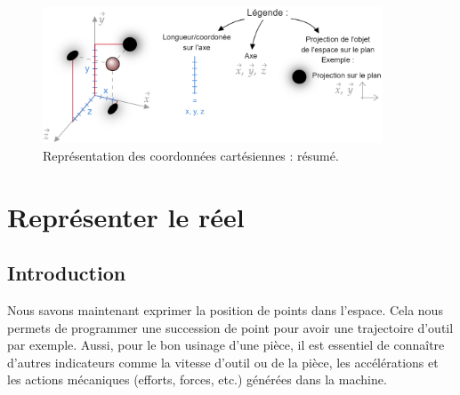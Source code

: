 \documentclass[
	11pt, %
	fleqn, %
	a4paper, %
]{LegrandOrangeBook}
\begin{document}
\begin{figure}[H] %
	\centering %
	\includegraphics[width=0.9\textwidth]{Images/coord10.png} %
	\caption{Représentation des coordonnées cartésiennes : résumé.}
	\label{coord10} %
\end{figure}



\chapterspaceabove{6.25cm} %
\chapterspacebelow{7.5cm} %

\chapter{Représenter le réel}

\section{Introduction}
Nous savons maintenant exprimer la position de points dans l'espace. Cela nous permets de programmer une succession de point pour avoir une trajectoire d'outil par exemple. Aussi, pour le bon usinage d'une pièce, il est essentiel de connaître d'autres indicateurs comme la vitesse d'outil ou de la pièce, les accélérations et les actions mécaniques (efforts, forces, etc.) générées dans la machine.

\begin{figure}[H]  %
	\centering %
\end{figure}
\end{document}
